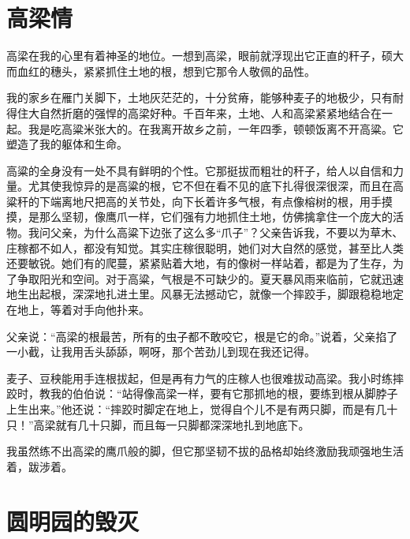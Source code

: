 \documentclass[12pt,UTF-8,openany]{ctexbook}
\begin{document}
\chapter{高梁情}

\begin{large}
    
    高梁在我的心里有着神圣的地位。一想到高梁，眼前就浮现出它正直的秆子，硕大而血红的穗头，紧紧抓住土地的根，想到它那令人敬佩的品性。
    
    我的家乡在雁门关脚下，土地灰茫茫的，十分贫瘠，能够种麦子的地极少，只有耐得住大自然折磨的强悍的高梁好种。千百年来，土地、人和高梁紧紧地结合在一起。我是吃高粱米张大的。在我离开故乡之前，一年四季，顿顿饭离不开高粱。它塑造了我的躯体和生命。
    
    高粱的全身没有一处不具有鲜明的个性。它那挺拔而粗壮的秆子，给人以自信和力量。尤其使我惊异的是高粱的根，它不但在看不见的底下扎得很深很深，而且在高粱秆的下端离地尺把高的关节处，向下长着许多气根，有点像榕树的根，用手摸摸，是那么坚韧，像鹰爪一样，它们强有力地抓住土地，仿佛擒拿住一个庞大的活物。我问父亲，为什么高粱下边张了这么多“爪子”？父亲告诉我，不要以为草木、庄稼都不如人，都没有知觉。其实庄稼很聪明，她们对大自然的感觉，甚至比人类还要敏锐。她们有的爬蔓，紧紧贴着大地，有的像树一样站着，都是为了生存，为了争取阳光和空间。对于高粱，气根是不可缺少的。夏天暴风雨来临前，它就迅速地生出起根，深深地扎进土里。风暴无法撼动它，就像一个摔跤手，脚跟稳稳地定在地上，等着对手向他扑来。
    
    父亲说：“高梁的根最苦，所有的虫子都不敢咬它，根是它的命。”说着，父亲掐了一小截，让我用舌头舔舔，啊呀，那个苦劲儿到现在我还记得。
    
    麦子、豆秧能用手连根拔起，但是再有力气的庄稼人也很难拔动高梁。我小时练摔跤时，教我的伯伯说：“站得像高梁一样，要有它那抓地的根，要练到根从脚脖子上生出来。”他还说：“摔跤时脚定在地上，觉得自个儿不是有两只脚，而是有几十只！”高梁就有几十只脚，而且每一只脚都深深地扎到地底下。
    
    我虽然练不出高梁的鹰爪般的脚，但它那坚韧不拔的品格却始终激励我顽强地生活着，跋涉着。
    
\end{large}



\chapter{圆明园的毁灭}
\end{document}
